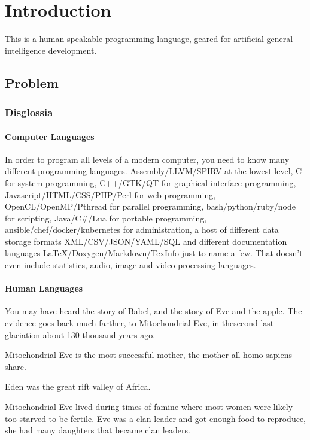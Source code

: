\chapter{Introduction}
\begin{multicols}{2}

This is a human speakable programming language, geared for artificial general
intelligence development.

\section{Problem}
\subsection{Disglossia}

\subsubsection{Computer Languages}
In order to program all levels of a modern computer, you need to know many
different programming languages. Assembly/LLVM/SPIRV at the lowest level, C for
system programming, C++/GTK/QT for graphical interface programming,
Javascript/HTML/CSS/PHP/Perl for web programming, OpenCL/OpenMP/Pthread for parallel programming,
bash/python/ruby/node for scripting, Java/C\#/Lua for portable programming,
ansible/chef/docker/kubernetes for administration, a host of different data
storage formats XML/CSV/JSON/YAML/SQL and different documentation languages
LaTeX/Doxygen/Markdown/TexInfo just to name a few. That doesn't even include
statistics, audio, image and video processing languages.

\subsubsection{Human Languages}

You may have heard the story of Babel, and the story of Eve and the apple.
The evidence goes back much farther, to Mitochondrial Eve, in thesecond last
glaciation about 130 thousand years ago.

Mitochondrial Eve is the most successful mother, the mother all homo-sapiens
share.

Eden was the great rift valley of Africa.

Mitochondrial Eve lived during times of famine where most women were likely too
starved to be fertile.  Eve was a clan leader and got enough food to reproduce,
she had many daughters that became clan leaders. 


\end{multicols}
